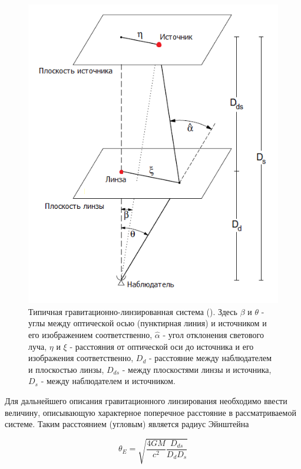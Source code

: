 \begin{figure}[H]
    \centering
	\includegraphics[scale=0.7]{pics/gravlenssyst.png}
	\caption{Типичная гравитационно-линзированная система (\cite{gravlensbook}). Здесь $\beta$ и $\theta$ - углы между оптической осью (пунктирная линия) и источником и его изображением соответственно, $\hat{\alpha}$ - угол отклонения светового луча, $\eta$ и $\xi$ - расстояния от оптической оси до источника и его изображения соответственно,  $D_d$ - расстояние между наблюдателем и плоскостью линзы, $D_{ds}$ - между плоскостями линзы и источника, $D_s$ - между наблюдателем и источником.\label{fig:gravlensfig} }
   \end{figure} 



Для дальнейшего описания гравитационного линзирования необходимо ввести величину, описывающую характерное поперечное расстояние в рассматриваемой системе. Таким расстоянием (угловым) является радиус Эйнштейна

\begin{equation}\label{r_ein}
\theta_{E}=\sqrt{\frac{4 G M}{c^{2}} \frac{D_{d s}}{D_{d} D_{s}}}
\end{equation}

